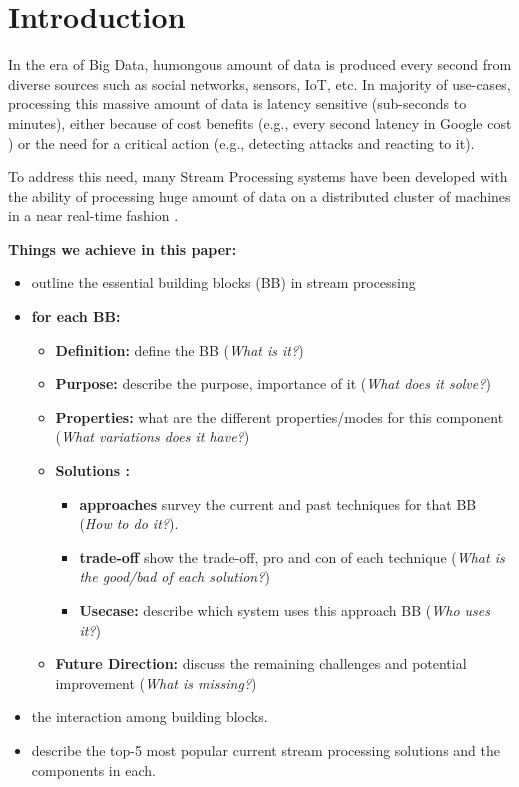 \section{Introduction}
\label{sec:intro}

In the era of Big Data, humongous amount of data is produced every second from diverse sources such as social networks, sensors, IoT, etc. In majority of use-cases, processing this massive amount of data  is latency sensitive (sub-seconds to minutes), either because of  cost benefits (e.g., every second latency in Google cost ) or the need for a critical action (e.g., detecting attacks and reacting to it).

To address this need, many Stream Processing systems have been developed with the ability of processing huge amount of data on a distributed cluster of machines in a near real-time fashion .  


\textbf{Things we achieve in this paper: }

\begin{itemize}
	\item outline the essential building blocks (BB) in stream processing
	\item \textbf{for each BB: }
	\begin{itemize}
		\item \textbf{Definition: }  define the BB (\textit{What is it?})
		\item \textbf{Purpose: } describe the purpose, importance of it (\textit{What does it solve?})
		\item \textbf{Properties:} what are the different properties/modes for this component (\textit{What variations does it have?})
		\item \textbf{Solutions :}
		\begin{itemize}
		\item \textbf{approaches} survey the current  and past techniques for that BB (\textit{How to do it?}). 
		\item \textbf{trade-off} show the trade-off, pro and con of  each technique (\textit{What is the good/bad of each solution?}) 
		\item \textbf{Usecase: } describe which system uses this approach BB (\textit{Who uses it?})
		\end{itemize}
		\item \textbf{Future Direction:} discuss the remaining challenges and potential improvement (\textit{What is missing?})
	\end{itemize}
	\item the interaction among building blocks.
	\item describe the top-5 most popular current stream processing solutions and the components in each.

\end{itemize}






